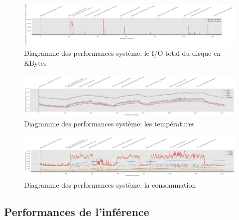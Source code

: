 {\begin{landscape}
\begin{figure}[H]
      \label{fig:io_segnetcamera}
   \end{figure} 
   \begin{figure}[H]
      \centering
      \includegraphics[width=1.5\textwidth]{io_totaldisk}
      \caption{Diagramme des performances système: le I/O total du disque en KBytes}
      \label{fig:io_totaldisk}
   \end{figure} 
   \begin{figure}[H]
      \centering
      \includegraphics[width=1.5\textwidth]{temperature}
      \caption[Diagramme des performances système: les températures]{Diagramme des performances système: les températures\protect\footnotemark}
      \label{fig:temperature}
   \end{figure} 
   \begin{figure}[H]
      \centering
      \includegraphics[width=1.5\textwidth]{consommation}
      \caption{Diagramme des performances système: la consommation}
      \label{fig:consommation}
   \end{figure}
   \end{landscape}
}
\subsection{Performances de l'inférence}
